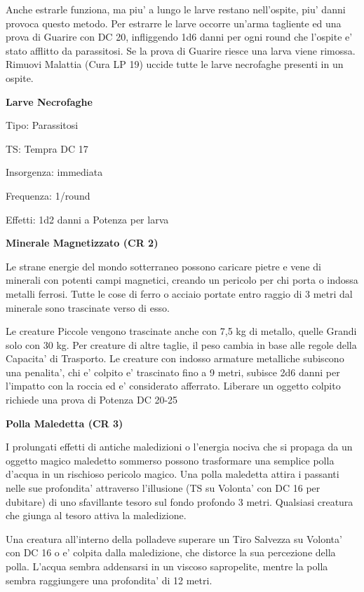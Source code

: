 \documentclass[a4paper,11pt,twoside,openany]{dndbook}
\begin{document}
{Anche estrarle funziona, ma piu' a lungo le larve restano nell'ospite, piu' danni provoca questo metodo. Per estrarre le larve occorre un'arma tagliente ed una prova di Guarire con DC 20, infliggendo 1d6 danni per ogni round che l'ospite e' stato afflitto da parassitosi. Se la prova di Guarire riesce una larva viene rimossa. Rimuovi Malattia (Cura LP 19) uccide tutte le larve necrofaghe presenti in un ospite.

\textbf{Larve Necrofaghe}

Tipo: Parassitosi

TS: Tempra DC 17

Insorgenza: immediata

Frequenza: 1/round

Effetti: 1d2 danni a Potenza per larva

\textbf{Minerale Magnetizzato (CR 2)}

Le strane energie del mondo sotterraneo possono caricare pietre e vene di minerali con potenti campi magnetici, creando un pericolo per chi porta o indossa metalli ferrosi. Tutte le cose di ferro o acciaio portate entro raggio di 3 metri dal minerale sono trascinate verso di esso.

Le creature Piccole vengono trascinate anche con 7,5 kg di metallo, quelle Grandi solo con 30 kg. Per creature di altre taglie, il peso cambia in base alle regole della Capacita' di Trasporto. Le creature con indosso armature metalliche subiscono una penalita', chi e' colpito e' trascinato fino a 9 metri, subisce 2d6 danni per l'impatto con la roccia ed e' considerato afferrato. Liberare un oggetto colpito richiede una prova di Potenza DC 20-25

\textbf{Polla Maledetta (CR 3)}

I prolungati effetti di antiche maledizioni o l'energia nociva che si propaga da un oggetto magico maledetto sommerso possono trasformare una semplice polla d'acqua in un rischioso pericolo magico. Una polla maledetta attira i passanti nelle sue profondita' attraverso l'illusione (TS su Volonta' con DC 16 per dubitare) di uno sfavillante tesoro sul fondo profondo 3 metri. Qualsiasi creatura che giunga al tesoro attiva la maledizione.

Una creatura all'interno della polladeve superare un Tiro Salvezza su Volonta' con DC 16 o e' colpita dalla maledizione, che distorce la sua percezione della polla. L'acqua sembra addensarsi in un viscoso sapropelite, mentre la polla sembra raggiungere una profondita' di 12 metri.

}
\end{document}
